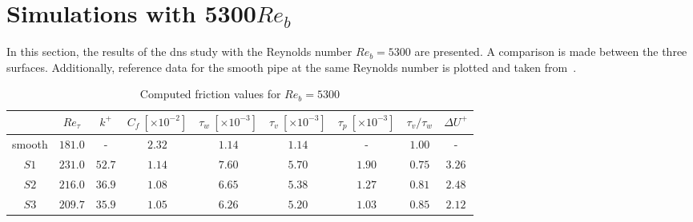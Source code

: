\section{Simulations with 5300$Re_b$}\label{sec: results 5300Reb}
In this section, the results of the \acrshort{dns} study with the Reynolds number $Re_b = 5300$ are presented.
A comparison is made between the three surfaces.
Additionally, reference data for the smooth pipe at the same Reynolds number is plotted and taken from~\cite{yaoDirectNumericalSimulations2023}.
\begin{table}
    \centering
    \caption[Computed friction values for $Re_b = 5300$]{Computed friction values for $Re_b = 5300$}
    \begin{tabular}{c c c c c c c c c}
        \toprule
                & $Re_\tau$ & $k^+$     & $C_f\ [\times10^{-2}]$ & $\tau_w\ [\times10^{-3}]$ & $\tau_v\ [\times10^{-3}]$ & $\tau_p\ [\times10^{-3}]$ & $\tau_v/\tau_w$   & $\Delta U^+$\\
        \midrule
        smooth  & $181.0$   & -         & $2.32$   & $1.14$   & $1.14$   & -                     & $1.00$           & - \\
        $S1$    & $231.0$   & $52.7$   & $1.14$   & $7.60$   & $5.70$   & $1.90$    & $0.75$           & $3.26$\\
        $S2$    & $216.0$   & $36.9$   & $1.08$   & $6.65$   & $5.38$   & $1.27$    & $0.81$           & $2.48$\\
        $S3$    & $209.7$   & $35.9$   & $1.05$   & $6.26$   & $5.20$   & $1.03$    & $0.85$           & $2.12$\\
        \bottomrule
    \end{tabular}
    
    \label{tab: friction values Reb 5300}
\end{table}
